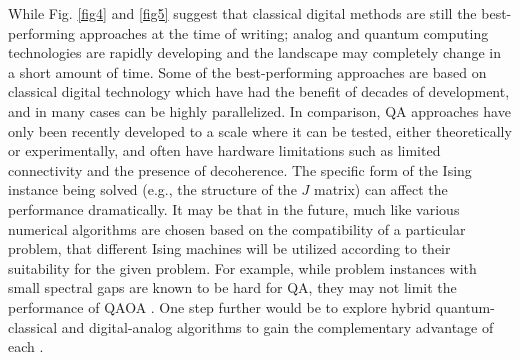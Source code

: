 \documentclass[fleqn,10pt]{wlscirep}
\def\fromNM#1{{\color{blue}\small{\bf } {\em #1}}}
\begin{document}
While Fig. \ref{fig4} and \ref{fig5} suggest that classical digital methods are still the best-performing approaches at the time of writing; analog and quantum computing technologies are rapidly developing and the landscape may completely change in a short amount of time.  Some of the best-performing approaches are based on classical digital technology which have had the benefit of decades of development, and in many cases can be highly parallelized.  
In comparison, QA approaches have only been recently developed to a scale where it can be tested, either theoretically or experimentally, and often have hardware limitations such as limited connectivity and the presence of decoherence. The specific form of the Ising instance being solved (e.g., the structure of the $J$ matrix) can affect the performance dramatically.  It may be that in the future, much like various numerical algorithms are chosen based on the compatibility of a particular problem, that different Ising machines will be utilized according to their suitability for the given problem. For example, while problem instances with small spectral gaps are known to be hard for QA, they may not limit the performance of QAOA \cite{zhou2020quantum}. 
One step further would be to explore hybrid quantum-classical and digital-analog algorithms to gain the complementary advantage of each \cite{chancellor2017modernizing}. 
\end{document}
